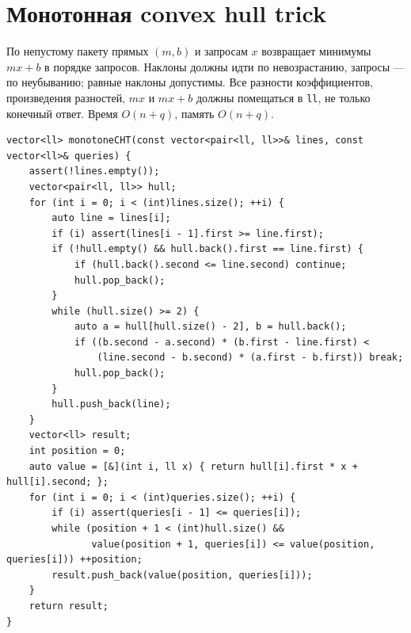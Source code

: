\section{Монотонная convex hull trick}
По непустому пакету прямых $(m,b)$ и запросам $x$ возвращает минимумы $mx+b$ в порядке запросов.
Наклоны должны идти по невозрастанию, запросы --- по неубыванию; равные наклоны допустимы.
Все разности коэффициентов, произведения разностей, $mx$ и $mx+b$ должны помещаться в \texttt{ll}, не только конечный ответ.
Время $O(n+q)$, память $O(n+q)$.
\begin{lstlisting}[name=optimization_cht]
vector<ll> monotoneCHT(const vector<pair<ll, ll>>& lines, const vector<ll>& queries) {
    assert(!lines.empty());
    vector<pair<ll, ll>> hull;
    for (int i = 0; i < (int)lines.size(); ++i) {
        auto line = lines[i];
        if (i) assert(lines[i - 1].first >= line.first);
        if (!hull.empty() && hull.back().first == line.first) {
            if (hull.back().second <= line.second) continue;
            hull.pop_back();
        }
        while (hull.size() >= 2) {
            auto a = hull[hull.size() - 2], b = hull.back();
            if ((b.second - a.second) * (b.first - line.first) <
                (line.second - b.second) * (a.first - b.first)) break;
            hull.pop_back();
        }
        hull.push_back(line);
    }
    vector<ll> result;
    int position = 0;
    auto value = [&](int i, ll x) { return hull[i].first * x + hull[i].second; };
    for (int i = 0; i < (int)queries.size(); ++i) {
        if (i) assert(queries[i - 1] <= queries[i]);
        while (position + 1 < (int)hull.size() &&
               value(position + 1, queries[i]) <= value(position, queries[i])) ++position;
        result.push_back(value(position, queries[i]));
    }
    return result;
}
\end{lstlisting}
\fi

%

